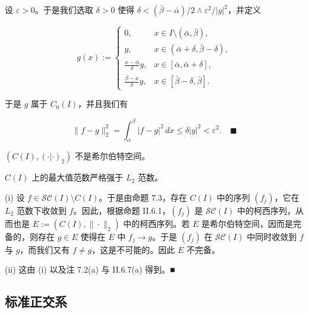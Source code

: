 \begin{proposition}
设 $ \varepsilon > 0 $。于是我们选取 $ \delta > 0 $ 使得 $ \delta < (\bar{\beta} - \bar{\alpha})/2 \wedge \varepsilon^{2}/|y|^{2} $，并定义

\begin{equation*}
g(x) := \begin{cases} 0 , & x \in I \setminus(\bar{\alpha}, \bar{\beta}) , \\ y , & x \in (\bar{\alpha} + \delta, \bar{\beta} - \delta) , \\ \frac{x - \bar{\alpha}}{\delta} y , & x \in [\bar{\alpha}, \bar{\alpha} + \delta] , \\ \frac{\bar{\beta} - x}{\delta} y , & x \in [\bar{\beta} - \delta, \bar{\beta}] . \end{cases}
\end{equation*}

于是 $ g $ 属于 $ C_{0}(I) $，并且我们有

\[
\|f - g\|_{2}^{2} = \int_{\alpha}^{\beta} |f - g|^{2} \, dx \le \delta|y|^{2} < \varepsilon^{2} .\quad\blacksquare
\]
\end{proposition}

\begin{corollary}

\begin{subitems}
\item

$ (C(I), (\cdot|\cdot)_{2}) $ 不是希尔伯特空间。

\item

$ C(I) $ 上的最大值范数严格强于 $ L_{2} $ 范数。

\proofhead
(i) 设 $ f \in \mathcal{SC}(I) \setminus C(I) $。于是由命题 7.3，存在 $ C(I) $ 中的序列 $ (f_{j}) $，它在 $ L_{2} $ 范数下收敛到 $ f $。因此，根据命题 II.6.1，$ (f_{j}) $ 是 $ \mathcal{SC}(I) $ 中的柯西序列，从而也是
$ E := (C(I), \|\cdot\|_{2}) $ 中的柯西序列。若 $ E $ 是希尔伯特空间，因而是完备的，则存在 $ g \in E $ 使得在 $ E $ 中 $ f_{j} \to g $。于是 $ (f_{j}) $ 在 $ \mathcal{SC}(I) $ 中同时收敛到 $ f $ 与 $ g $，而我们又有 $ f \ne g $，这是不可能的。因此 $ E $ 不完备。
\end{subitems}

(ii) 这由 (i) 以及注 7.2(a) 与 II.6.7(a) 得到。\nobreak\hspace{0.35em}■

\end{corollary}

\subsection*{标准正交系}

